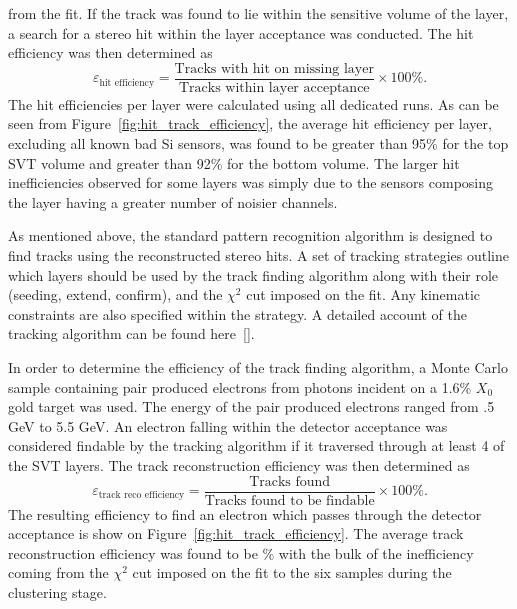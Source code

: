 from the fit. If the track was found to lie within the sensitive volume
of the layer, a search for a stereo hit within the layer acceptance was 
conducted.  The hit efficiency was then determined as
\[
    \varepsilon_{\mbox{hit efficiency}} = \frac{\mbox{Tracks with hit on missing layer}}
                                            {\mbox{Tracks within layer acceptance}} \times 100 \%.
\]
The hit efficiencies per layer were calculated using all dedicated runs. As 
can be seen from Figure~\ref{fig:hit_track_efficiency}, the average hit efficiency
per layer, excluding all known bad Si sensors, was found to be greater than
95\% for the top SVT volume and greater than 92\% for the bottom volume.  The 
larger hit inefficiencies observed for some layers was simply due to the 
sensors composing the layer having a greater number of noisier channels.

As mentioned above, the standard pattern recognition algorithm is designed to 
find tracks using the reconstructed stereo hits.  A set of tracking strategies
outline which layers should be used by the track finding algorithm along
with their role (seeding, extend, confirm), and the $\chi^2$ cut imposed 
on the fit. Any kinematic constraints are also specified within the strategy.
A detailed account of the tracking algorithm can be found  here~\ref{}.

In order to determine the efficiency of the track finding algorithm, a Monte
Carlo sample containing pair produced electrons from photons incident on 
a 1.6\% $X_0$ gold target was used.  The energy of the pair produced electrons
ranged from .5 GeV to 5.5 GeV. An electron falling within the detector 
acceptance was considered findable by the tracking algorithm if it 
traversed through at least 4 of the SVT layers. The track reconstruction
efficiency was then determined as
\[
    \varepsilon_{\mbox{track reco efficiency}} = \frac{\mbox{Tracks found}}
                                            {\mbox{Tracks found to be findable}} \times 100 \%.
\]
The resulting efficiency to find an electron which passes through the detector
acceptance is show on Figure~\ref{fig:hit_track_efficiency}. The average track
reconstruction efficiency was found to be \% with the bulk of the inefficiency
coming from the $\chi^2$ cut imposed on the fit to the six samples during
the clustering stage.

